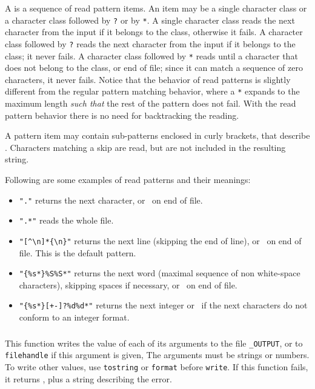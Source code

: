 A  is a sequence of read pattern items.
An item may be a single character class
or a character class followed by \verb|?| or by \verb|*|.
A single character class reads the next character from the input
if it belongs to the class, otherwise it fails.
A character class followed by \verb|?| reads the next character
from the input if it belongs to the class;
it never fails.
A character class followed by \verb|*| reads until a character that
does not belong to the class, or end of file;
since it can match a sequence of zero characters, it never fails.
Notice that the behavior of read patterns is slightly different from
the regular pattern matching behavior,
where a \verb|*| expands to the maximum length \emph{such that}
the rest of the pattern does not fail.
With the read pattern behavior
there is no need for backtracking the reading.

A pattern item may contain sub-patterns enclosed in curly brackets,
that describe .
Characters matching a skip are read,
but are not included in the resulting string.

Following are some examples of read patterns and their meanings:
\begin{itemize}
\item \verb|"."| returns the next character, or \nil\ on end of file.
\item \verb|".*"| reads the whole file.
\item \verb|"[^\n]*{\n}"| returns the next line
(skipping the end of line), or \nil\ on end of file.
This is the default pattern.
\item \verb|"{%s*}%S%S*"| returns the next word
(maximal sequence of non white-space characters),
skipping spaces if necessary,
or \nil\ on end of file.
\item \verb|"{%s*}[+-]?%d%d*"| returns the next integer
or \nil\ if the next characters do not conform to an integer format.
\end{itemize}

\subsubsection*{\ff {}}

This function writes the value of each of its arguments to the
file \verb|_OUTPUT|,
or to \verb|filehandle| if this argument is given,
The arguments must be strings or numbers.
To write other values,
use \verb|tostring| or \verb|format| before \verb|write|.
If this function fails, it returns \nil,
plus a string describing the error.

